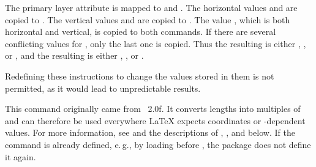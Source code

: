 The primary layer attribute  is mapped to
 and
. The horizontal values  and  are
copied to . The vertical values  and 
are copied to . The value , which is both 
horizontal and vertical, is copied to both commands. If there are several
conflicting values for , only the last one is copied. Thus the
resulting  is either , , or ,
and the resulting  is either , , or
.

Redefining these instructions to change the values stored
in them is not permitted, as it would lead to unpredictable results.%
\EndIndexGroup


\begin{Declaration}
\end{Declaration}
This command originally came from
~2.0f. It converts lengths into
multiples of  and can therefore be used everywhere \LaTeX{}
expects  coordinates or -dependent
values. For more information, see \cite{package:eso-pic} and the descriptions
of , , and  below. If the command is 
already defined, e.\,g., by loading  before
, the package does not define it again.%
\iffalse%
\par
It should be noted at this point that using package
\Package{picture}\IndexPackage{picture}\textnote{\Package{picture}} (see
\cite{package:picture}) supersedes \Macro{LenToUnit} more or less. The package
extends environment \Environment{picture} and the picture commands so that you
can use \LaTeX{} lengths directly for coordinates.%
\fi
\EndIndexGroup


